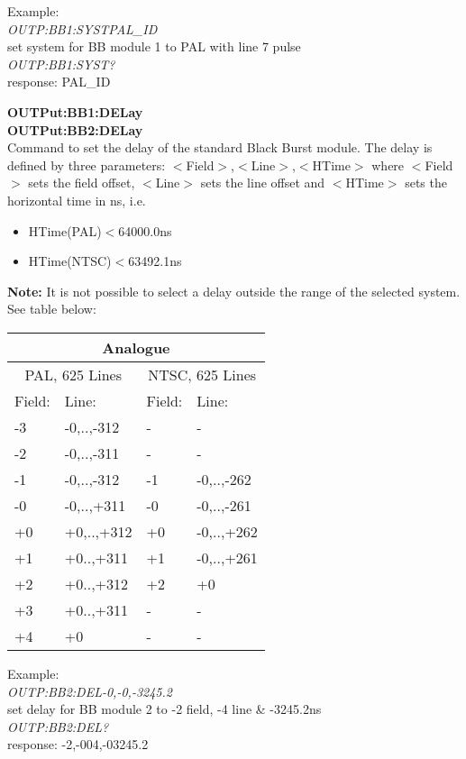 Example:\\
\textit{OUTP:BB1:SYSTPAL\_ID}\\
set system for BB module 1 to PAL with line 7 pulse\\
\textit{OUTP:BB1:SYST?}\\ 
response: PAL\_ID

\textbf{OUTPut:BB1:DELay}\\
\textbf{OUTPut:BB2:DELay}\\
Command to set the delay of the standard Black Burst module. The delay is defined by three parameters: $<$Field$>$,$<$Line$>$,$<$HTime$>$
where $<$Field$>$ sets the field offset, $<$Line$>$ sets the line offset and $<$HTime$>$ sets the horizontal time in ns, i.e.
\begin{itemize}
\item HTime(PAL)$<$64000.0ns
\item HTime(NTSC)$<$63492.1ns
\end{itemize}

\textbf{Note:} It is not possible to select a delay outside the range of the selected system. See table below:

\begin{tabular}{|l|l|l|l|}
\hline
\multicolumn{4}{|c|}{Analogue} \\ 
\hline
\multicolumn{2}{|c|}{PAL, 625 Lines} & \multicolumn{2}{|c|}{NTSC, 625 Lines} \\ 
\hline
Field: 	& Line: 			& Field: 				& Line: 			\\ \hline
-3 			& -0,..,-312	& -							& -						\\ \hline
-2			& -0,..,-311	& -							& -						\\ \hline
-1			& -0,..,-312	& -1 						& -0,..,-262	\\ \hline
-0			& -0,..,+311	& -0 						& -0,..,-261	\\ \hline
+0			& +0,..,+312	& +0						& -0,..,+262	\\ \hline
+1			& +0..,+311		& +1						& -0,..,+261	\\ \hline
+2			& +0..,+312		& +2						& +0					\\ \hline
+3			& +0..,+311		& -							& -						\\ \hline
+4			& +0					& -							& -						\\ \hline
\end{tabular}

Example:\\
\textit{OUTP:BB2:DEL-0,-0,-3245.2}\\
set delay for BB module 2 to -2 field, -4 line \& -3245.2ns\\
\textit{OUTP:BB2:DEL?}\\
response: -2,-004,-03245.2\\

